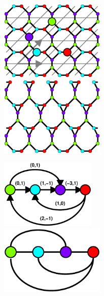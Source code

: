 \documentclass{beamer}
\begin{document}
\begin{frame}
  \begin{minipage}{2in}
     \begin{center}
         \includegraphics[height=1.5in]{periodic2a}\\
         \includegraphics[height=1.5in]{periodic1c}\\
     \end{center}
  \end{minipage}
  \begin{minipage}{1.8in}
     \begin{center}
       \includegraphics[height=1.3in]{periodic2b}\\
       \includegraphics[height=1.3in]{periodic1b}\\
     \end{center}
  \end{minipage}
\end{frame}
\end{document}
